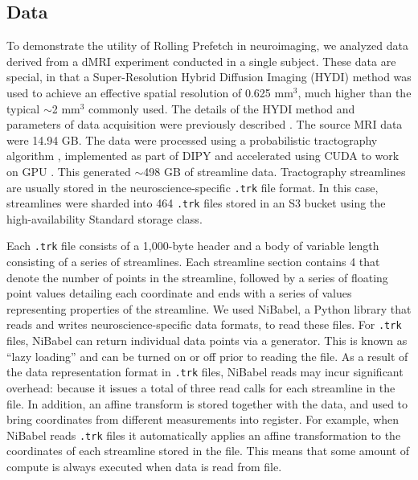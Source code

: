 
\subsection{Data}

To demonstrate the utility of Rolling Prefetch in neuroimaging, we analyzed data
derived from a dMRI experiment conducted in a single subject. These data are
special, in that a  Super-Resolution Hybrid Diffusion Imaging (HYDI) method was
used to achieve an effective spatial resolution of 0.625 mm$^3$, much higher
than the typical $\sim$2 mm$^3$ commonly used. The details of the HYDI method
and parameters of data acquisition were previously described
\cite{Elsaid2019-ez}. The source MRI data were 14.94 GB. The data were processed
using a probabilistic tractography algorithm \cite{Berman2008-xg}, implemented
as part of DIPY \cite{Garyfallidis2014-el} and accelerated using CUDA to work on
GPU \cite{rokem2021gpu}. This  generated $\sim$498 GB of streamline data.
Tractography streamlines are usually stored in the neuroscience-specific
\texttt{.trk} file format. In this case, streamlines were sharded into 464
\texttt{.trk} files stored in an S3 bucket using the high-availability Standard
storage class. 

 Each \texttt{.trk} file consists of a 1,000-byte header and a body of
variable length consisting of a series of streamlines. Each streamline section
contains \SI{4}{\byte} that denote the number of points in the streamline,
followed by a series of floating point values detailing each coordinate and ends
with a series of values representing properties of the streamline. We used
NiBabel, a Python library that reads and writes  neuroscience-specific data
formats, to read these files. For \texttt{.trk} files, NiBabel can return
individual data points via a generator. This is known as ``lazy loading'' and
can be turned on or off prior to reading the file. As a result of the data
representation format in \texttt{.trk} files, NiBabel reads may incur
significant overhead: because it issues a total of three read calls for each
streamline in the file.
In addition, an affine transform is stored together with the data, and used to
bring coordinates from different measurements into register. For example, when
NiBabel reads \texttt{.trk} files it automatically applies an affine
transformation to the coordinates of each streamline stored in the file. This
means that some amount of compute is always executed when data is read from
file.

